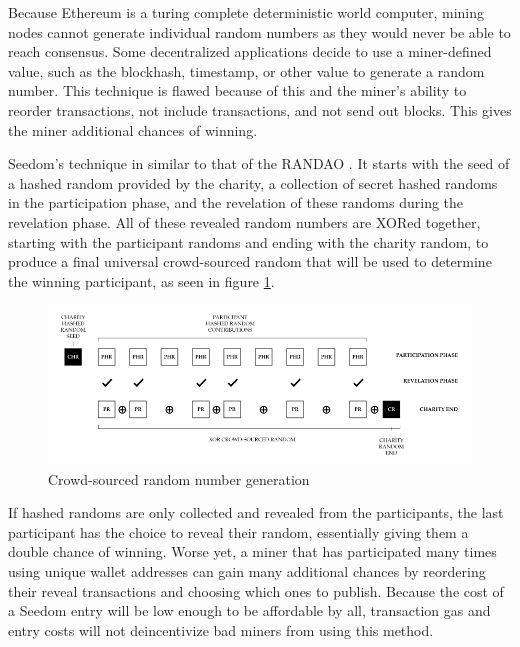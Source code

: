 \documentclass[11pt]{article}
\begin{document}
Because Ethereum is a turing complete deterministic world computer, mining nodes cannot generate individual random numbers as they would never be able to reach consensus. Some decentralized applications decide to use a miner-defined value, such as the blockhash, timestamp, or other value to generate a random number. This technique is flawed because of this and the miner's ability to reorder transactions, not include transactions, and not send out blocks. This gives the miner additional chances of winning.

Seedom's technique in similar to that of the RANDAO \cite{2}. It starts with the seed of a hashed random provided by the charity, a collection of secret hashed randoms in the participation phase, and the revelation of these randoms during the revelation phase. All of these revealed random numbers are XORed together, starting with the participant randoms and ending with the charity random, to produce a final universal crowd-sourced random that will be used to determine the winning participant, as seen in figure \ref{figure:crowdsourcedRandomNumberGeneration}.

\begin{figure}[!htb]
\begin{center}
\includegraphics[width=1.0\textwidth]{crowdsourcedRandomNumberGeneration.png}
\caption{Crowd-sourced random number generation}
\label{figure:crowdsourcedRandomNumberGeneration}
\end{center}
\end{figure}

If hashed randoms are only collected and revealed from the participants, the last participant has the choice to reveal their random, essentially giving them a double chance of winning. Worse yet, a miner that has participated many times using unique wallet addresses can gain many additional chances by reordering their reveal transactions and choosing which ones to publish. Because the cost of a Seedom entry will be low enough to be affordable by all, transaction gas and entry costs will not deincentivize bad miners from using this method.
\end{document}
